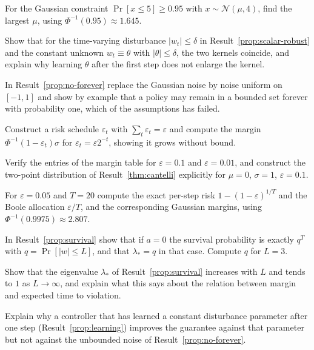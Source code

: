 \begin{exercise}
For the Gaussian constraint $\Pr[x\le5]\ge0.95$ with $x\sim\mathcal N(\mu,4)$, find the largest $\mu$, using $\Phi^{-1}(0.95)\approx1.645$.
\end{exercise}

\begin{exercise}
Show that for the time-varying disturbance $|w_t|\le\delta$ in Result~\ref{prop:scalar-robust} and the constant unknown $w_t\equiv\theta$ with $|\theta|\le\delta$, the two kernels coincide, and explain why learning $\theta$ after the first step does not enlarge the kernel.
\end{exercise}

\begin{exercise}
In Result~\ref{prop:no-forever} replace the Gaussian noise by noise uniform on $[-1,1]$ and show by example that a policy may remain in a bounded set forever with probability one, which of the assumptions has failed.
\end{exercise}

\begin{exercise}
Construct a risk schedule $\varepsilon_t$ with $\sum_t\varepsilon_t=\varepsilon$ and compute the margin $\Phi^{-1}(1-\varepsilon_t)\sigma$ for $\varepsilon_t=\varepsilon2^{-t}$, showing it grows without bound.
\end{exercise}

\begin{exercise}
Verify the entries of the margin table for $\varepsilon=0.1$ and $\varepsilon=0.01$, and construct the two-point distribution of Result~\ref{thm:cantelli} explicitly for $\mu=0$, $\sigma=1$, $\varepsilon=0.1$.
\end{exercise}

\begin{exercise}
For $\varepsilon=0.05$ and $T=20$ compute the exact per-step risk $1-(1-\varepsilon)^{1/T}$ and the Boole allocation $\varepsilon/T$, and the corresponding Gaussian margins, using $\Phi^{-1}(0.9975)\approx2.807$.
\end{exercise}

\begin{exercise}
In Result~\ref{prop:survival} show that if $a=0$ the survival probability is exactly $q^{T}$ with $q=\Pr[|w|\le L]$, and that $\lambda_*=q$ in that case. Compute $q$ for $L=3$.\label{ex2:a-zero}
\end{exercise}

\begin{exercise}
Show that the eigenvalue $\lambda_*$ of Result~\ref{prop:survival} increases with $L$ and tends to $1$ as $L\to\infty$, and explain what this says about the relation between margin and expected time to violation.\label{ex2:lambda-mono}
\end{exercise}

\begin{exercise}
Explain why a controller that has learned a constant disturbance parameter after one step (Result~\ref{prop:learning}) improves the guarantee against that parameter but not against the unbounded noise of Result~\ref{prop:no-forever}.
\end{exercise}

